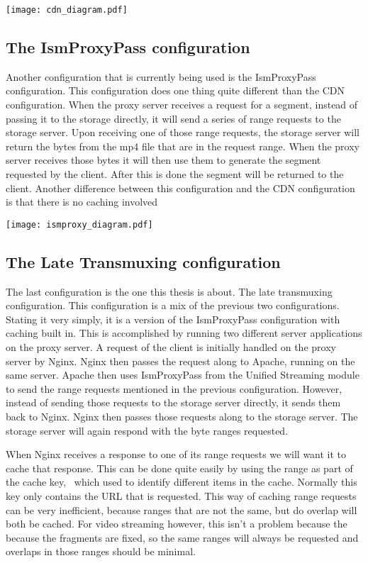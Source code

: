 \documentclass[twoside,openright]{uva-bachelor-thesis}
\begin{document}
\texttt{[image: cdn\_diagram.pdf]}

\subsection{The IsmProxyPass configuration}
Another configuration that is currently being used is the IsmProxyPass
configuration. This configuration does one thing quite different than the
CDN configuration. When the proxy server receives a request for a segment,
instead of passing it to the storage directly, it will send a series of range
requests to the storage server. Upon receiving one of those range requests, the
storage server will return the bytes from the mp4 file that are in the request
range. When the proxy server receives those bytes it will then use them to
generate the segment requested by the client. After this is done the segment
will be returned to the client. Another difference between this configuration
and the CDN configuration is that there is no caching involved


\texttt{[image: ismproxy\_diagram.pdf]}

\subsection{The Late Transmuxing configuration}
The last configuration is the one this thesis is about. The late transmuxing
configuration. This configuration is a mix of the previous two configurations.
Stating it very simply, it is a version of the IsmProxyPass configuration with
caching built in. This is accomplished by running two different server
applications on the proxy server. A request of the client is initially handled
on the proxy server by Nginx. Nginx then passes the request along to Apache,
running on the same server. Apache then uses IsmProxyPass from the Unified
Streaming module to send the range requests mentioned in the previous
configuration.  However, instead of sending those requests to the storage server
directly, it sends them back to Nginx. Nginx then passes those requests along to
the storage server. The storage server will again respond with the byte ranges
requested.

When Nginx receives a response to one of its range requests we will want it to
cache that response. This can be done quite easily by using the range as part of
the cache key,~\autocite{nginxforum} which used to identify different items in
the cache. Normally this key only contains the URL that is requested. This way
of caching range requests can be very inefficient, because ranges that are not
the same, but do overlap will both be cached. For video streaming however, this
isn't a problem because the because the fragments are fixed, so the same ranges
will always be requested and overlaps in those ranges should be minimal.
\end{document}
